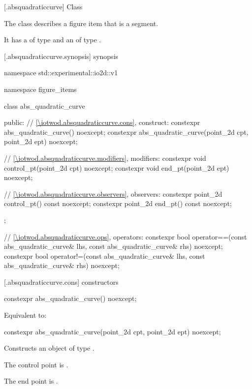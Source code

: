  [\iotwod.absquadraticcurve] {Class }

\pnum
{}%
The class  describes a figure item that is a segment.

\pnum
It has a  of type  and an  of type .

 [\iotwod.absquadraticcurve.synopsis] { synopsis}

\begin{codeblock}
namespace std::experimental::io2d::v1 {
  namespace figure_items {
    class abs_quadratic_curve {
    public:
      // \ref{\iotwod.absquadraticcurve.cons}, construct:
      constexpr abs_quadratic_curve() noexcept;
      constexpr abs_quadratic_curve(point_2d cpt, point_2d ept)
        noexcept;

      // \ref{\iotwod.absquadraticcurve.modifiers}, modifiers:
      constexpr void control_pt(point_2d cpt) noexcept;
      constexpr void end_pt(point_2d ept) noexcept;

      // \ref{\iotwod.absquadraticcurve.observers}, observers:
      constexpr point_2d control_pt() const noexcept;
      constexpr point_2d end_pt() const noexcept;
    };
    
    // \ref{\iotwod.absquadraticcurve.ops}, operators:
    constexpr bool operator==(const abs_quadratic_curve& lhs,
      const abs_quadratic_curve& rhs) noexcept;
    constexpr bool operator!=(const abs_quadratic_curve& lhs,
      const abs_quadratic_curve& rhs) noexcept;
  }
}
\end{codeblock}

 [\iotwod.absquadraticcurve.cons] { constructors}

%
\begin{itemdecl}
constexpr abs_quadratic_curve() noexcept;
\end{itemdecl}
\begin{itemdescr}
\pnum
\effects
Equivalent to: 
\end{itemdescr}

%
\begin{itemdecl}
constexpr abs_quadratic_curve(point_2d cpt, point_2d ept)
  noexcept;
\end{itemdecl}
\begin{itemdescr}
\pnum
\effects
Constructs an object of type .

\pnum
The control point is .

\pnum
The end point is .
\end{itemdescr}

